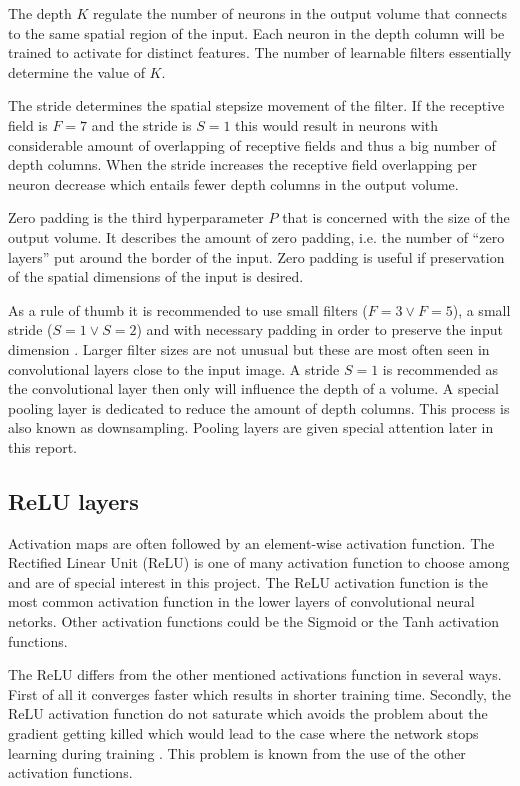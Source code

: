 The depth $K$ regulate the number of neurons in the output volume that connects to the same spatial region of the input. Each neuron in the depth column will be trained to activate for distinct features. The number of learnable filters essentially determine the value of $K$.

The stride determines the spatial stepsize movement of the filter. If the
receptive field is $F = 7$ and the stride is $S = 1$ this would result in
neurons with considerable amount of overlapping of receptive fields and thus a
big number of depth columns. When the stride increases the receptive field
overlapping per neuron decrease which entails fewer depth columns in the output
volume.

Zero padding is the third hyperparameter $P$ that is concerned with the size of
the output volume. It describes the amount of zero padding, i.e. the number of
``zero layers'' put around the border of the input. Zero padding is useful if
preservation of the spatial dimensions of the input is desired.

As a rule of thumb it is recommended to use small filters ($F=3 \vee F=5$), a
small stride ($S=1 \vee S=2$) and with necessary padding in order to preserve
the input dimension \cite{cs231n}. Larger filter sizes are not unusual but these
are most often seen in convolutional layers close to the input image. A stride
$S=1$ is recommended as the convolutional layer then only will influence the
depth of a volume. A special pooling layer is dedicated to reduce the amount of
depth columns. This process is also known as downsampling. Pooling layers are
given special attention later in this report.

\subsection{ReLU layers} %
\label{sub:relu_layers}

Activation maps are often followed by an element-wise activation function. The Rectified Linear Unit (ReLU) is one of many activation function to choose among and are of special interest in this project. The ReLU activation function is the most common activation function in the lower layers of convolutional neural netorks. Other activation functions could be the Sigmoid or the Tanh activation functions.

The ReLU differs from the other mentioned activations function in several ways.
First of all it converges faster which results in shorter training time.
Secondly, the ReLU activation function do not saturate which avoids the problem
about the gradient getting killed which would lead to the case where the network
stops learning during training \cite{cs231n}. This problem is known from the use
of the other activation functions.

